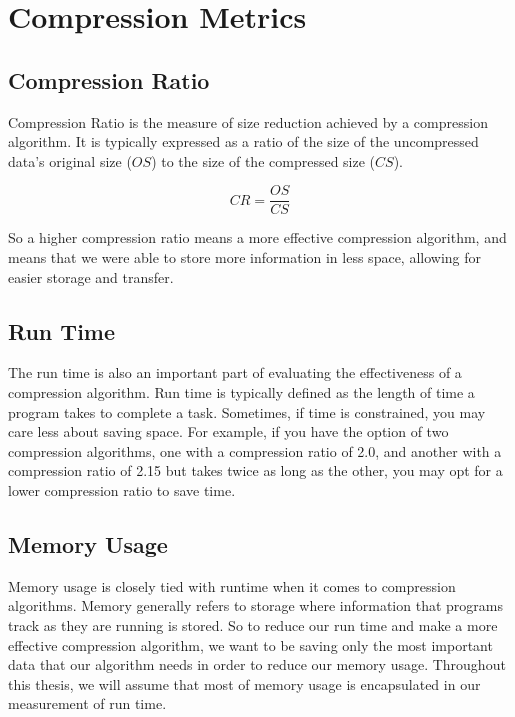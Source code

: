 \documentclass[12pt,twoside]{reedthesis}
\begin{document}
\hypertarget{compression-metrics}{%
\section{Compression Metrics}\label{compression-metrics}}

\hypertarget{compression-ratio}{%
\subsection{Compression Ratio}\label{compression-ratio}}

Compression Ratio is the measure of size reduction achieved by a compression algorithm. It is typically expressed as a ratio of the size of the uncompressed data's original size (\(OS\)) to the size of the compressed size (\(CS\)).

\[CR = \frac{OS}{CS}\]

So a higher compression ratio means a more effective compression algorithm, and means that we were able to store more information in less space, allowing for easier storage and transfer.

\hypertarget{run-time}{%
\subsection{Run Time}\label{run-time}}

The run time is also an important part of evaluating the effectiveness of a compression algorithm. Run time is typically defined as the length of time a program takes to complete a task. Sometimes, if time is constrained, you may care less about saving space. For example, if you have the option of two compression algorithms, one with a compression ratio of 2.0, and another with a compression ratio of 2.15 but takes twice as long as the other, you may opt for a lower compression ratio to save time.

\hypertarget{memory-usage}{%
\subsection{Memory Usage}\label{memory-usage}}

Memory usage is closely tied with runtime when it comes to compression algorithms. Memory generally refers to storage where information that programs track as they are running is stored. So to reduce our run time and make a more effective compression algorithm, we want to be saving only the most important data that our algorithm needs in order to reduce our memory usage. Throughout this thesis, we will assume that most of memory usage is encapsulated in our measurement of run time.
\end{document}
